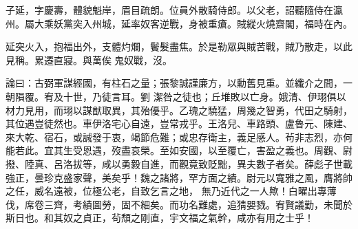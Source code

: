\begin{pinyinscope}
 子延，字慶壽，體貌魁岸，眉目疏朗。位員外散騎侍郎。以父老，詔聽隨侍在瀛州。屬大乘妖黨突入州城，延率奴客逆戰，身被重瘡。賊縱火燒齋閣，福時在內。



 延突火入，抱福出外，支體灼爛，鬢髮盡焦。於是勒眾與賊苦戰，賊乃散走，以此見稱。累遷直寢。與萬俟鬼奴戰，沒。



 論曰：古弼軍謀經國，有柱石之量；張黎誠謹廉方，以勳舊見重。並纖介之間，一朝隕覆。宥及十世，乃徒言耳。劉
 潔咎之徒也；丘堆敗以亡身。娥清、伊珝俱以材力見用，而珝以謀猷取異，其殆優乎。乙瑰之驍猛，周幾之智勇，代田之騎射，其位遇豈徒然也。車伊洛宅心自遠，豈常戎乎。王洛兒、車路頭、盧魯元、陳建、來大乾、宿石，或誠發于衷，竭節危難；或忠存衛主，義足感人。茍非志烈，亦何能若此。宜其生受恩遇，歿盡哀榮。至如安國，以至覆亡，害盈之義也。周觀、尉撥、陸真、呂洛拔等，咸以勇毅自進，而觀竟致貶黜，異夫數子者矣。薛彪子世載強正，曇珍克盛家聲，美矣乎！魏之諸將，罕方面之績。尉元以寬雅之風，膺將帥之任，威名遠被，位極公老，自致乞言之地，
 無乃近代之一人歟！白曜出專薄伐，席卷三齊，考績圖勞，固不細矣。而功名難處，追猜嬰戮。宥賢議勤，未聞於斯日也。和其奴之貞正，茍頹之剛直，宇文福之氣幹，咸亦有用之士乎！



\end{pinyinscope}